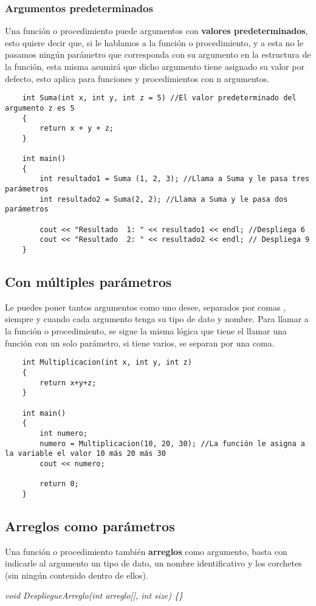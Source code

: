 \subsubsection{Argumentos predeterminados}
\hspace{0.55cm}Una función o procedimiento puede argumentos con \textbf{valores predeterminados}, esto quiere decir que, si le hablamos a la función o procedimiento, y a esta no le pasamos ningún parámetro que corresponda con su argumento en la estructura de la función, esta misma asumirá que dicho argumento tiene asignado su valor por defecto, esto aplica para funciones y procedimientos con n argumentos.
\begin{lstlisting}
    int Suma(int x, int y, int z = 5) //El valor predeterminado del argumento z es 5
    {
        return x + y + z;
    }
    
    int main()
    {
        int resultado1 = Suma (1, 2, 3); //Llama a Suma y le pasa tres parámetros
        int resultado2 = Suma(2, 2); //Llama a Suma y le pasa dos parámetros
        
        cout << "Resultado  1: " << resultado1 << endl; //Despliega 6
        cout << "Resultado  2: " << resultado2 << endl; // Despliega 9
    }
\end{lstlisting}


\subsection{Con múltiples parámetros}
\hspace{0.55cm}Le puedes poner tantos argumentos como uno desee, separados por comas , siempre y cuando cada argumento tenga su tipo de dato y nombre. Para llamar a la función o procedimiento, se sigue la misma lógica que tiene el llamar una función con un solo parámetro, si tiene varios, se separan por una coma. 
\begin{lstlisting}
    int Multiplicacion(int x, int y, int z)
    {
        return x+y+z;
    }
    
    int main()
    {
        int numero;
        numero = Multiplicacion(10, 20, 30); //La función le asigna a la variable el valor 10 más 20 más 30
        cout << numero;
        
        return 0;
    }
\end{lstlisting}


\subsection{Arreglos como parámetros}
\hspace{0.55cm}Una función o procedimiento también \textbf{arreglos} como argumento, basta con indicarle al argumento un tipo de dato, un nombre identificativo y los corchetes (sin ningún contenido dentro de ellos).
\begin{center}
    \textit{void DespliegueArreglo(int arreglo[], int size) \{\}}
\end{center}

